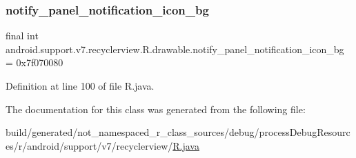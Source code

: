 \subsubsection{\texorpdfstring{notify\_panel\_notification\_icon\_bg}{notify\_panel\_notification\_icon\_bg}}
{\footnotesize\ttfamily final int android.\+support.\+v7.\+recyclerview.\+R.\+drawable.\+notify\+\_\+panel\+\_\+notification\+\_\+icon\+\_\+bg = 0x7f070080\hspace{0.3cm}{\ttfamily [static]}}



Definition at line 100 of file R.\+java.



The documentation for this class was generated from the following file\+:\begin{DoxyCompactItemize}
\item 
build/generated/not\+\_\+namespaced\+\_\+r\+\_\+class\+\_\+sources/debug/process\+Debug\+Resources/r/android/support/v7/recyclerview/\mbox{\hyperlink{android_2support_2v7_2recyclerview_2_r_8java}{R.\+java}}\end{DoxyCompactItemize}
